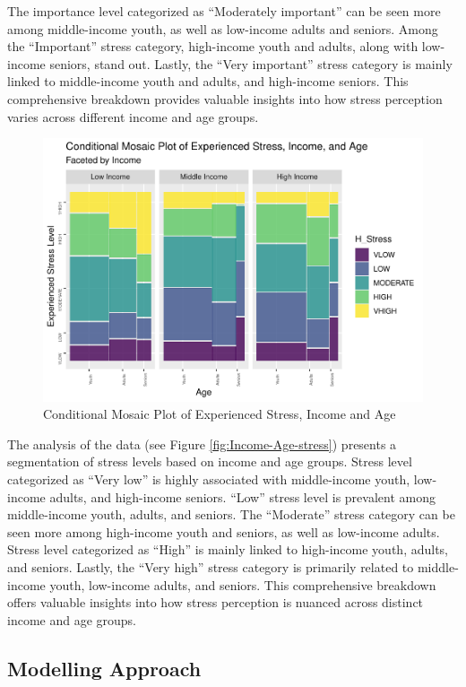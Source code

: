 \documentclass[
11pt, %
oneside, %
english, %
singlespacing, %
]{macthesis} %
\begin{document}
The importance level categorized as ``Moderately important'' can be seen more among middle-income youth, as well as low-income adults and seniors. Among the ``Important'' stress category, high-income youth and adults, along with low-income seniors, stand out. Lastly, the ``Very important'' stress category is mainly linked to middle-income youth and adults, and high-income seniors. This comprehensive breakdown provides valuable insights into how stress perception varies across different income and age groups.
\begin{figure}
\includegraphics[width=0.85\linewidth]{thesis_files/figure-latex/unnamed-chunk-34-1} \caption{\label{fig:Income-Age-stress}Conditional Mosaic Plot of Experienced Stress, Income and Age}\label{fig:unnamed-chunk-34}
\end{figure}
The analysis of the data (see Figure \ref{fig:Income-Age-stress}) presents a segmentation of stress levels based on income and age groups. Stress level categorized as ``Very low'' is highly associated with middle-income youth, low-income adults, and high-income seniors. ``Low'' stress level is prevalent among middle-income youth, adults, and seniors. The ``Moderate'' stress category can be seen more among high-income youth and seniors, as well as low-income adults. Stress level categorized as ``High'' is mainly linked to high-income youth, adults, and seniors. Lastly, the ``Very high'' stress category is primarily related to middle-income youth, low-income adults, and seniors. This comprehensive breakdown offers valuable insights into how stress perception is nuanced across distinct income and age groups.

\hypertarget{modelling-approach}{%
\subsection{Modelling Approach}\label{modelling-approach}}
\end{document}
